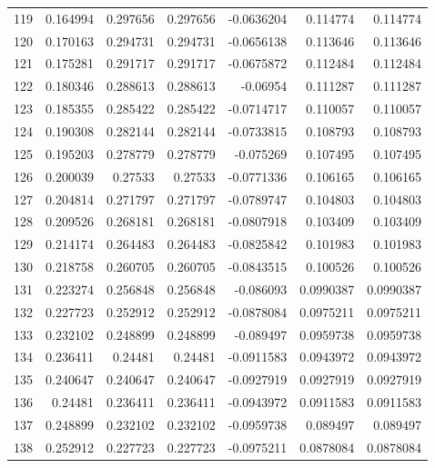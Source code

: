 \begin{tabular}{rrrrrrr}
 119 &  0.164994    & 0.297656    & 0.297656    & -0.0636204   & 0.114774    & 0.114774    \\
 120 &  0.170163    & 0.294731    & 0.294731    & -0.0656138   & 0.113646    & 0.113646    \\
 121 &  0.175281    & 0.291717    & 0.291717    & -0.0675872   & 0.112484    & 0.112484    \\
 122 &  0.180346    & 0.288613    & 0.288613    & -0.06954     & 0.111287    & 0.111287    \\
 123 &  0.185355    & 0.285422    & 0.285422    & -0.0714717   & 0.110057    & 0.110057    \\
 124 &  0.190308    & 0.282144    & 0.282144    & -0.0733815   & 0.108793    & 0.108793    \\
 125 &  0.195203    & 0.278779    & 0.278779    & -0.075269    & 0.107495    & 0.107495    \\
 126 &  0.200039    & 0.27533     & 0.27533     & -0.0771336   & 0.106165    & 0.106165    \\
 127 &  0.204814    & 0.271797    & 0.271797    & -0.0789747   & 0.104803    & 0.104803    \\
 128 &  0.209526    & 0.268181    & 0.268181    & -0.0807918   & 0.103409    & 0.103409    \\
 129 &  0.214174    & 0.264483    & 0.264483    & -0.0825842   & 0.101983    & 0.101983    \\
 130 &  0.218758    & 0.260705    & 0.260705    & -0.0843515   & 0.100526    & 0.100526    \\
 131 &  0.223274    & 0.256848    & 0.256848    & -0.086093    & 0.0990387   & 0.0990387   \\
 132 &  0.227723    & 0.252912    & 0.252912    & -0.0878084   & 0.0975211   & 0.0975211   \\
 133 &  0.232102    & 0.248899    & 0.248899    & -0.089497    & 0.0959738   & 0.0959738   \\
 134 &  0.236411    & 0.24481     & 0.24481     & -0.0911583   & 0.0943972   & 0.0943972   \\
 135 &  0.240647    & 0.240647    & 0.240647    & -0.0927919   & 0.0927919   & 0.0927919   \\
 136 &  0.24481     & 0.236411    & 0.236411    & -0.0943972   & 0.0911583   & 0.0911583   \\
 137 &  0.248899    & 0.232102    & 0.232102    & -0.0959738   & 0.089497    & 0.089497    \\
 138 &  0.252912    & 0.227723    & 0.227723    & -0.0975211   & 0.0878084   & 0.0878084   \\

\end{tabular}
